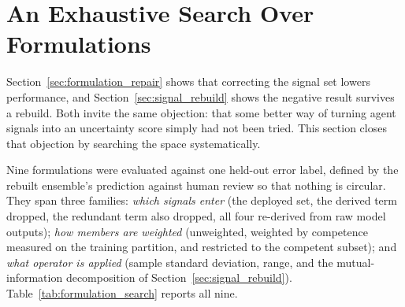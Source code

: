 \documentclass[12pt,a4paper]{report}
\begin{document}
\section{An Exhaustive Search Over Formulations}
\label{sec:formulation_search}

Section~\ref{sec:formulation_repair} shows that correcting the signal set lowers performance, and
Section~\ref{sec:signal_rebuild} shows the negative result survives a rebuild. Both invite the
same objection: that some better way of turning agent signals into an uncertainty score simply
had not been tried. This section closes that objection by searching the space systematically.

Nine formulations were evaluated against one held-out error label, defined by the rebuilt
ensemble's prediction against human review so that nothing is circular. They span three families:
\emph{which signals enter} (the deployed set, the derived term dropped, the redundant term also
dropped, all four re-derived from raw model outputs); \emph{how members are weighted}
(unweighted, weighted by competence measured on the training partition, and restricted to the
competent subset); and \emph{what operator is applied} (sample standard deviation, range, and the
mutual-information decomposition of Section~\ref{sec:signal_rebuild}). Table~\ref{tab:formulation_search} reports all nine.
\end{document}
